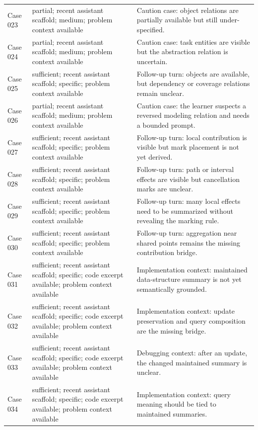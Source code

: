 \documentclass[11pt]{article}
\begin{document}
\begin{landscape}
\begin{xltabular}{\textwidth}{>{\raggedright\arraybackslash}p{0.08\textwidth}>{\raggedright\arraybackslash}p{0.34\textwidth}>{\raggedright\arraybackslash}X}
Case 023 & partial; recent assistant scaffold; medium; problem context available & Caution case: object relations are partially available but still under-specified. \\
Case 024 & partial; recent assistant scaffold; medium; problem context available & Caution case: task entities are visible but the abstraction relation is uncertain. \\
Case 025 & sufficient; recent assistant scaffold; specific; problem context available & Follow-up turn: objects are available, but dependency or coverage relations remain unclear. \\
Case 026 & partial; recent assistant scaffold; medium; problem context available & Caution case: the learner suspects a reversed modeling relation and needs a bounded prompt. \\
Case 027 & sufficient; recent assistant scaffold; specific; problem context available & Follow-up turn: local contribution is visible but mark placement is not yet derived. \\
Case 028 & sufficient; recent assistant scaffold; specific; problem context available & Follow-up turn: path or interval effects are visible but cancellation marks are unclear. \\
Case 029 & sufficient; recent assistant scaffold; specific; problem context available & Follow-up turn: many local effects need to be summarized without revealing the marking rule. \\
Case 030 & sufficient; recent assistant scaffold; specific; problem context available & Follow-up turn: aggregation near shared points remains the missing contribution bridge. \\
Case 031 & sufficient; recent assistant scaffold; specific; code excerpt available; problem context available & Implementation context: maintained data-structure summary is not yet semantically grounded. \\
Case 032 & sufficient; recent assistant scaffold; specific; code excerpt available; problem context available & Implementation context: update preservation and query composition are the missing bridge. \\
Case 033 & sufficient; recent assistant scaffold; specific; code excerpt available; problem context available & Debugging context: after an update, the changed maintained summary is unclear. \\
Case 034 & sufficient; recent assistant scaffold; specific; code excerpt available; problem context available & Implementation context: query meaning should be tied to maintained summaries. \\

\end{xltabular}
\end{landscape}
\end{document}
